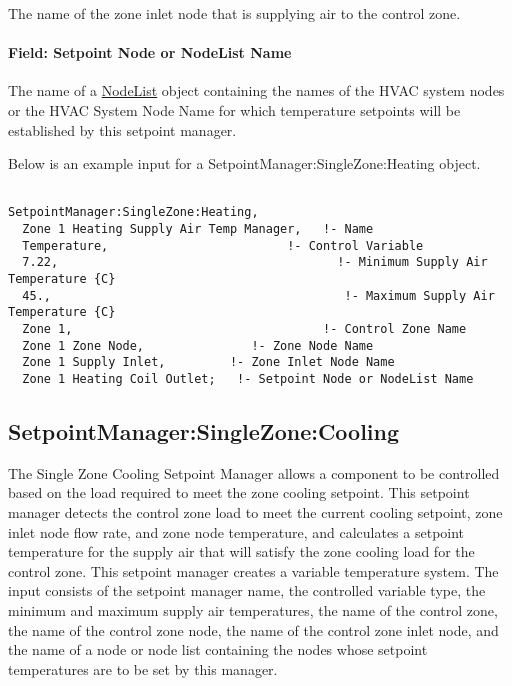 The name of the zone inlet node that is supplying air to the control zone.

\paragraph{Field: Setpoint Node or NodeList Name}\label{field-setpoint-node-or-nodelist-name-4}

The name of a \hyperref[nodelist]{NodeList} object containing the names of the HVAC system nodes or the HVAC System Node Name for which temperature setpoints will be established by this setpoint manager.

Below is an example input for a SetpointManager:SingleZone:Heating object.

\begin{lstlisting}

SetpointManager:SingleZone:Heating,
  Zone 1 Heating Supply Air Temp Manager,   !- Name
  Temperature,                         !- Control Variable
  7.22,                                       !- Minimum Supply Air Temperature {C}
  45.,                                         !- Maximum Supply Air Temperature {C}
  Zone 1,                                   !- Control Zone Name
  Zone 1 Zone Node,               !- Zone Node Name
  Zone 1 Supply Inlet,         !- Zone Inlet Node Name
  Zone 1 Heating Coil Outlet;   !- Setpoint Node or NodeList Name
\end{lstlisting}

\subsection{SetpointManager:SingleZone:Cooling}\label{setpointmanagersinglezonecooling}

The Single Zone Cooling Setpoint Manager allows a component to be controlled based on the load required to meet the zone cooling setpoint. This setpoint manager detects the control zone load to meet the current cooling setpoint, zone inlet node flow rate, and zone node temperature, and calculates a setpoint temperature for the supply air that will satisfy the zone cooling load for the control zone. This setpoint manager creates a variable temperature system. The input consists of the setpoint manager name, the controlled variable type, the minimum and maximum supply air temperatures, the name of the control zone, the name of the control zone node, the name of the control zone inlet node, and the name of a node or node list containing the nodes whose setpoint temperatures are to be set by this manager.

